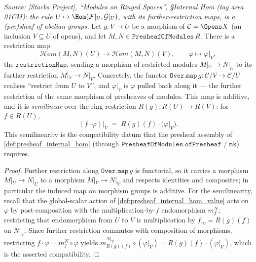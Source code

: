 \begin{lemma}\leanok
  \label{lem:presheaf_internal_hom_restriction}
  \textit{Source: [Stacks Project], ``Modules on Ringed Spaces'', \S Internal Hom
  (tag area 01CM): the rule \(U \mapsto \Hom(\mathcal{F}|_U, \mathcal{G}|_U)\), with its
  further-restriction maps, is a (pre)sheaf of abelian groups.}
  Let \(g : V \to U\) be a morphism of \(\mathcal{C} = \Opens X\) (an inclusion
  \(V \subseteq U\) of opens), and let \(M, N \in \mathtt{PresheafOfModules}\,R\). There
  is a restriction map
  \[
    \mathcal{H}om(M, N)(U) \longrightarrow \mathcal{H}om(M, N)(V),
    \qquad \varphi \longmapsto \varphi|_V,
  \]
  the \(\mathtt{restrictionMap}\), sending a morphism of restricted modules
  \(M|_U \to N|_U\) to its further restriction \(M|_V \to N|_V\). Concretely, the
  functor \(\mathtt{Over.map}\,g : \mathcal{C}/V \to \mathcal{C}/U\) realises
  ``restrict from \(U\) to \(V\)'', and \(\varphi|_V\) is \(\varphi\) pulled back along
  it --- the further restriction of the same morphism of presheaves of modules. This
  map is additive, and it is \emph{semilinear} over the ring restriction
  \(R(g) : R(U) \to R(V)\): for \(f \in R(U)\),
  \[
    (f \cdot \varphi)\big|_V \;=\; R(g)(f) \cdot \bigl(\varphi|_V\bigr).
  \]
  This semilinearity is the compatibility datum that the presheaf assembly of
  \cref{def:presheaf_internal_hom} (through \(\mathtt{PresheafOfModules.ofPresheaf}\) /
  \(\mathtt{mk}\)) requires.
\end{lemma}

\begin{proof}
  \leanok
  Further restriction along \(\mathtt{Over.map}\,g\) is functorial, so it carries a
  morphism \(M|_U \to N|_U\) to a morphism \(M|_V \to N|_V\) and respects identities and
  composites; in particular the induced map on morphism groups is additive. For the
  semilinearity, recall that the global-scalar action of
  \cref{def:presheaf_internal_hom_value} acts on \(\varphi\) by post-composition with
  the multiplication-by-\(f\) endomorphism \(m_f^{N}\); restricting that endomorphism
  from \(U\) to \(V\) is multiplication by \(f|_V = R(g)(f)\) on \(N|_V\). Since further
  restriction commutes with composition of morphisms, restricting \(f \cdot \varphi =
  m_f^{N} \circ \varphi\) yields \(m_{R(g)(f)}^{N|_V} \circ (\varphi|_V) = R(g)(f) \cdot
  (\varphi|_V)\), which is the asserted compatibility.
\end{proof}

